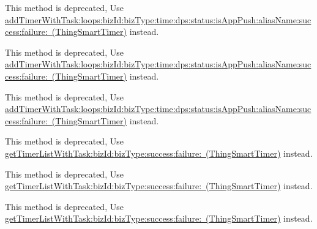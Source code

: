 \begin{DoxyRefList}
\label{deprecated__deprecated000114}%
%
This method is deprecated, Use \mbox{\hyperlink{interface_thing_smart_timer_a50e1140bc1cca7f995e872420b16487e}{add\+Timer\+With\+Task\+:loops\+:biz\+Id\+:biz\+Type\+:time\+:dps\+:status\+:is\+App\+Push\+:alias\+Name\+:success\+:failure\+: (\+Thing\+Smart\+Timer)}} instead. 

\label{deprecated__deprecated000123}%
%
This method is deprecated, Use \mbox{\hyperlink{interface_thing_smart_timer_a50e1140bc1cca7f995e872420b16487e}{add\+Timer\+With\+Task\+:loops\+:biz\+Id\+:biz\+Type\+:time\+:dps\+:status\+:is\+App\+Push\+:alias\+Name\+:success\+:failure\+: (\+Thing\+Smart\+Timer)}} instead. 

\label{deprecated__deprecated000105}%
%
This method is deprecated, Use \mbox{\hyperlink{interface_thing_smart_timer_a50e1140bc1cca7f995e872420b16487e}{add\+Timer\+With\+Task\+:loops\+:biz\+Id\+:biz\+Type\+:time\+:dps\+:status\+:is\+App\+Push\+:alias\+Name\+:success\+:failure\+: (\+Thing\+Smart\+Timer)}} instead.  
\item[(Thing\+Deprecated\+Api) Member \mbox{\hyperlink{category_thing_smart_timer_07_thing_deprecated_api_08_a718ba8e20eaeb0118ea64cfa737e921c}{\mbox{[}Thing\+Smart\+Timer(Thing\+Deprecated\+Api) get\+Timer\+With\+Task\+:dev\+Id\+:success\+:failure\+:\mbox{]}}} ]\label{deprecated__deprecated000103}%
%
This method is deprecated, Use \mbox{\hyperlink{interface_thing_smart_timer_a636ed7dbd11f77e442c6ab8b75b1f660}{get\+Timer\+List\+With\+Task\+:biz\+Id\+:biz\+Type\+:success\+:failure\+: (\+Thing\+Smart\+Timer)}} instead. 

\label{deprecated__deprecated000121}%
%
This method is deprecated, Use \mbox{\hyperlink{interface_thing_smart_timer_a636ed7dbd11f77e442c6ab8b75b1f660}{get\+Timer\+List\+With\+Task\+:biz\+Id\+:biz\+Type\+:success\+:failure\+: (\+Thing\+Smart\+Timer)}} instead. 

\label{deprecated__deprecated000130}%
%
This method is deprecated, Use \mbox{\hyperlink{interface_thing_smart_timer_a636ed7dbd11f77e442c6ab8b75b1f660}{get\+Timer\+List\+With\+Task\+:biz\+Id\+:biz\+Type\+:success\+:failure\+: (\+Thing\+Smart\+Timer)}} instead. 


\end{DoxyRefList}
